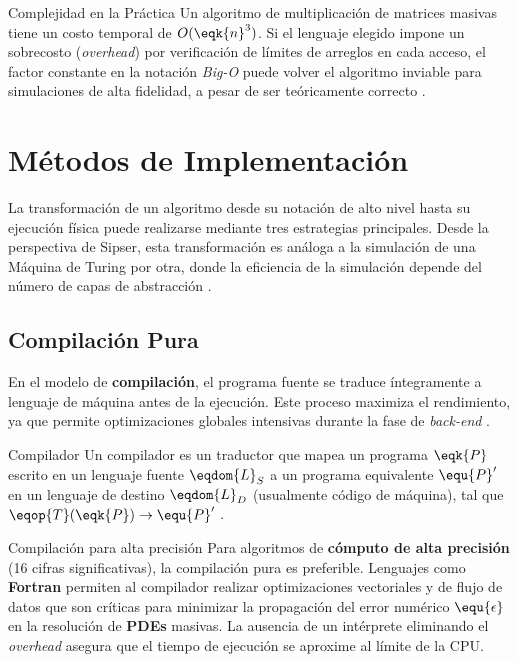 \begin{ejemplo}{Complejidad en la Práctica}
Un algoritmo de multiplicación de matrices masivas tiene un costo temporal de $O(\eqk{n}^3)$. Si el lenguaje elegido impone un sobrecosto (\textit{overhead}) por verificación de límites de arreglos en cada acceso, el factor constante en la notación \textit{Big-O} puede volver el algoritmo inviable para simulaciones de alta fidelidad, a pesar de ser teóricamente correcto \cite{sipser2012introduction}.
\end{ejemplo}



\section{Métodos de Implementación}
\label{sec:1_3_metodos_implementacion}

La transformación de un algoritmo desde su notación de alto nivel hasta su ejecución física puede realizarse mediante tres estrategias principales. Desde la perspectiva de Sipser, esta transformación es análoga a la simulación de una Máquina de Turing por otra, donde la eficiencia de la simulación depende del número de capas de abstracción \cite{sipser2012introduction}.

\subsection{Compilación Pura}

En el modelo de \textbf{compilación}, el programa fuente se traduce íntegramente a lenguaje de máquina antes de la ejecución. Este proceso maximiza el rendimiento, ya que permite optimizaciones globales intensivas durante la fase de \textit{back-end} \cite{sebesta2019concepts}.

\begin{definicion}{Compilador}
Un compilador es un traductor que mapea un programa $\eqk{P}$ escrito en un lenguaje fuente $\eqdom{L}_S$ a un programa equivalente $\equ{P}'$ en un lenguaje de destino $\eqdom{L}_D$ (usualmente código de máquina), tal que $\eqop{T}(\eqk{P}) \to \equ{P}'$ \cite{sipser2012introduction}.
\end{definicion}

\begin{fisicaconexion}{Compilación para alta precisión}
Para algoritmos de \textbf{cómputo de alta precisión} (16 cifras significativas), la compilación pura es preferible. Lenguajes como \textbf{Fortran} permiten al compilador realizar optimizaciones vectoriales y de flujo de datos que son críticas para minimizar la propagación del error numérico $\equ{\epsilon}$ en la resolución de \textbf{PDEs} masivas. La ausencia de un intérprete eliminando el \textit{overhead} asegura que el tiempo de ejecución se aproxime al límite de la CPU.
\end{fisicaconexion}

